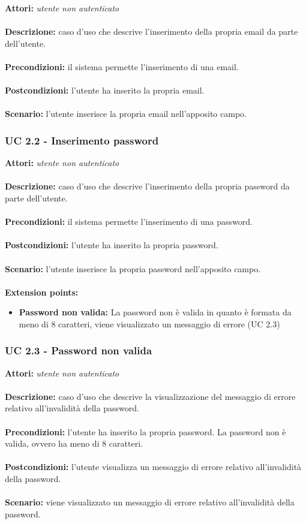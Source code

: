 \documentclass[a4paper,11pt]{article}
\begin{document}
\textbf{Attori:} \textit{utente non autenticato}
\\ \\
\textbf{Descrizione:} caso d'uso che descrive l'inserimento della propria email da parte dell'utente.\\
\\
\textbf{Precondizioni:} il sistema permette l'inserimento di una email.\\
\\
\textbf{Postcondizioni:} l’utente ha inserito la propria email.\\
\\
\textbf{Scenario:} l’utente inserisce la propria email nell'apposito campo.\\


\subsubsection{UC 2.2 - Inserimento password}

\textbf{Attori:} \textit{utente non autenticato}
\\ \\
\textbf{Descrizione:} caso d'uso che descrive l'inserimento della propria password da parte dell'utente.\\
\\
\textbf{Precondizioni:} il sistema permette l'inserimento di una password.\\
\\
\textbf{Postcondizioni:} l’utente ha inserito la propria password.\\
\\
\textbf{Scenario:} l’utente inserisce la propria password nell'apposito campo.\\
\\
\textbf{Extension points:} 
\begin{itemize}
	\item \textbf{Password non valida:} La password non è valida in quanto è formata da meno di 8 caratteri, viene visualizzato un messaggio di errore (UC 2.3)
\end{itemize}


\subsubsection{UC 2.3 - Password non valida}

\textbf{Attori:} \textit{utente non autenticato}
\\ \\
\textbf{Descrizione:} caso d'uso che descrive la visualizzazione del messaggio di errore relativo all'invalidità della password.\\
\\
\textbf{Precondizioni:} l'utente ha inserito la propria password. La password non è valida, ovvero ha meno di 8 caratteri.\\
\\
\textbf{Postcondizioni:} l’utente visualizza un messaggio di errore relativo all'invalidità della password.\\
\\
\textbf{Scenario:} viene visualizzato un messaggio di errore relativo all'invalidità della password.\\
\end{document}
